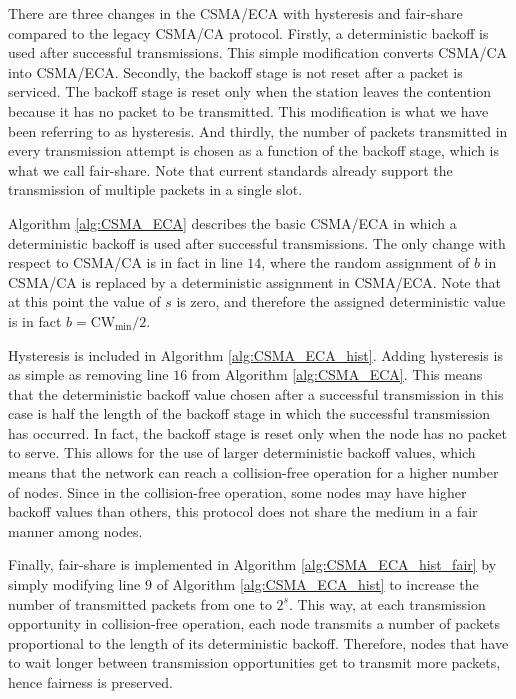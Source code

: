\documentclass[conference]{IEEEtran}
\begin{document}
There are three changes in the CSMA/ECA with hysteresis and fair-share compared to the legacy CSMA/CA protocol. Firstly, a deterministic backoff is used after successful transmissions. This simple modification converts CSMA/CA into CSMA/ECA.
Secondly, the backoff stage is not reset after a packet is serviced.
The backoff stage is reset only when the station leaves the contention because it has no packet to be transmitted. This modification is what we have been referring to as hysteresis.
And thirdly, the number of packets transmitted in every transmission attempt is chosen as a function of the backoff stage, which is what we call fair-share.
Note that current standards already support the transmission of multiple packets in a single slot.

Algorithm \ref{alg:CSMA_ECA} describes the basic CSMA/ECA in which a deterministic backoff is used after successful transmissions. The only change with respect to CSMA/CA is in fact in line $14$, where the random assignment of $b$ in CSMA/CA is replaced by a deterministic assignment in CSMA/ECA. Note that at this point the value of $s$ is zero, and therefore the assigned deterministic value is in fact $b = \text{CW}_{\min}/2$.

Hysteresis is included in Algorithm \ref{alg:CSMA_ECA_hist}. Adding hysteresis is as simple as removing line $16$ from Algorithm \ref{alg:CSMA_ECA}. This means that the deterministic backoff value chosen after a successful transmission in this case is half the length of the backoff stage in which the successful transmission has occurred. In fact, the backoff stage is reset only when the node has no packet to serve. This allows for the use of larger deterministic backoff values, which means that the network can reach a collision-free operation for a higher number of nodes. Since in the collision-free operation, some nodes may have higher backoff values than others, this protocol does not share the medium in a fair manner among nodes.

Finally, fair-share is implemented in Algorithm \ref{alg:CSMA_ECA_hist_fair} by simply modifying
line $9$ of Algorithm \ref{alg:CSMA_ECA_hist} to increase the number of transmitted packets from one to $2^s$. This way, at each transmission opportunity in collision-free operation, each node transmits a number of packets proportional to the length of its deterministic backoff. Therefore, nodes that have to wait longer between transmission opportunities get to transmit more packets, hence fairness is preserved.
\end{document}
